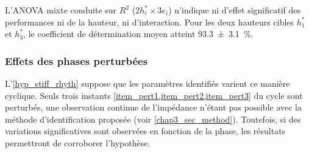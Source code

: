 
L'ANOVA mixte conduite sur $R^2$ ($2 h^*_i \times 3 e_i$) n'indique ni d'effet significatif des performances ni de la hauteur, ni d'interaction. Pour les deux hauteurs cibles $h^*_1$ et $h^*_3$, le coefficient de détermination moyen atteint \SI{93.3\pm3.1}{\percent}.


%


\subsubsection{Effets des phases perturbées} \label{chap4_sec_res_sub_impedance_2}

L'\cref{hyp_stiff_rhyth} suppose que les paramètres identifiés varient ce manière cyclique. Seuls trois instants \cref{item_pert1,item_pert2,item_pert3} du cycle sont perturbés, une observation continue de l'impédance n'étant pas possible avec la méthode d'identification proposée (voir \cref{chap3_sec_method}). Toutefois, si des variations significatives sont observées en fonction de la phase, les résultats permettront de corroborer l'hypothèse.

